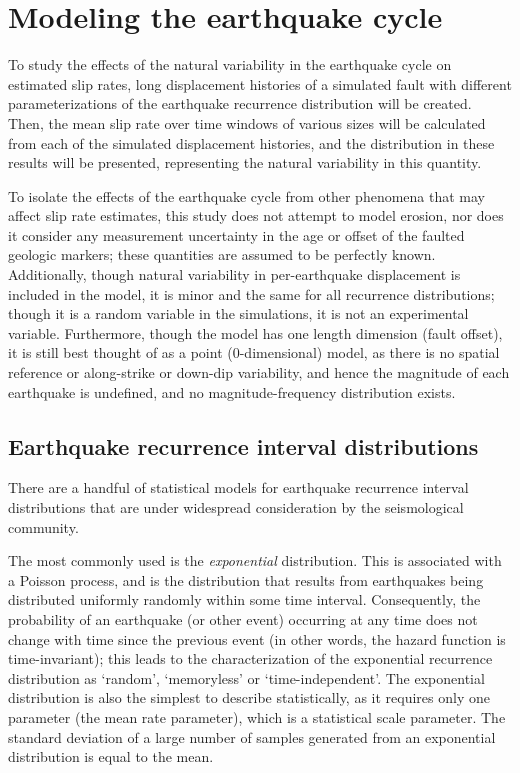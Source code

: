 \documentclass[se, manuscript]{copernicus}
\begin{document}
\section{Modeling the earthquake
cycle}\label{modeling-the-earthquake-cycle}

To study the effects of the natural variability in the earthquake cycle
on estimated slip rates, long displacement histories of a simulated
fault with different parameterizations of the earthquake recurrence
distribution will be created. Then, the mean slip rate over time windows
of various sizes will be calculated from each of the simulated
displacement histories, and the distribution in these results will be
presented, representing the natural variability in this quantity.

To isolate the effects of the earthquake cycle from other phenomena that
may affect slip rate estimates, this study does not attempt to model
erosion, nor does it consider any measurement uncertainty in the age or
offset of the faulted geologic markers; these quantities are assumed
to be perfectly known. Additionally, though natural variability in
per-earthquake displacement is included in the model, it is minor and
the same for all recurrence distributions; though it is a random variable in the
simulations, it is not an experimental variable. Furthermore, though the model
has one length dimension (fault offset), it is still best thought of as
a point (0-dimensional) model, as there is no spatial reference or
along-strike or down-dip variability, and hence the magnitude of each
earthquake is undefined, and no magnitude-frequency distribution exists.

\subsection{Earthquake recurrence interval
distributions}\label{earthquake-recurrence-interval-distributions}

There are a handful of statistical models for earthquake recurrence
interval distributions that are under widespread consideration by the
seismological community.

The most commonly used is the \emph{exponential} distribution. This is
associated with a Poisson process, and is the distribution that results
from earthquakes being distributed uniformly randomly within some time interval.
Consequently, the probability of an earthquake (or other event) occurring at any
time does not change with time since the previous event (in other words, the
hazard function is time-invariant); this leads to the characterization of the
exponential recurrence distribution as `random', `memoryless' or
`time-independent'. The exponential distribution is also the simplest to
describe statistically, as it requires only one parameter (the mean rate
parameter), which is a statistical scale parameter. The standard deviation of a
large number of samples generated from an exponential distribution is equal to
the mean.
\end{document}
